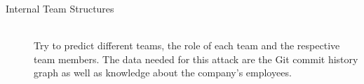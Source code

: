 \begin{description}
    \item[Internal Team Structures] \hfill \\
        Try to predict different teams, the role of each team and the respective team members.
        The data needed for this attack are the Git commit history graph as well as knowledge about the company's employees.
\end{description}

